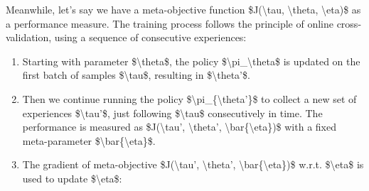 Meanwhile, let's say we have a meta-objective function \$J(\textbackslash tau, \textbackslash theta, \textbackslash eta)\$ as a performance measure. The training process follows the principle of online cross-validation, using a sequence of consecutive experiences:

\begin{enumerate}
\tightlist
\item
  Starting with parameter \$\textbackslash theta\$, the policy \$\textbackslash pi\_\textbackslash theta\$ is updated on the first batch of samples \$\textbackslash tau\$, resulting in \$\textbackslash theta'\$.
\item
  Then we continue running the policy \$\textbackslash pi\_\{\textbackslash theta'\}\$ to collect a new set of experiences \$\textbackslash tau'\$, just following \$\textbackslash tau\$ consecutively in time. The performance is measured as \$J(\textbackslash tau', \textbackslash theta', \textbackslash bar\{\textbackslash eta\})\$ with a fixed meta-parameter \$\textbackslash bar\{\textbackslash eta\}\$.
\item
  The gradient of meta-objective \$J(\textbackslash tau', \textbackslash theta', \textbackslash bar\{\textbackslash eta\})\$ w.r.t. \$\textbackslash eta\$ is used to update \$\textbackslash eta\$:
\end{enumerate}

